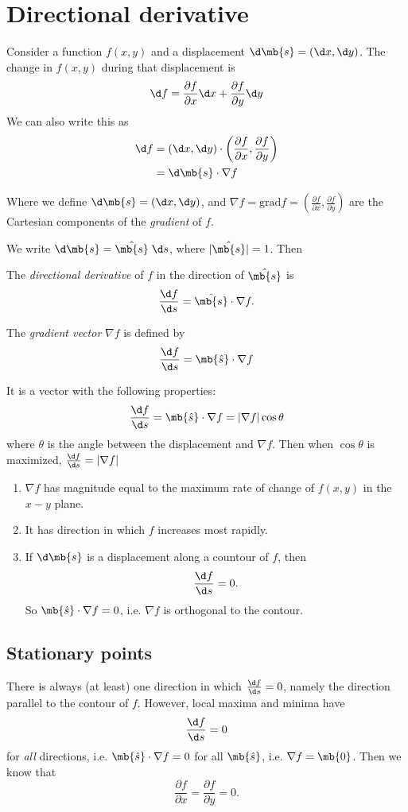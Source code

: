 \documentclass[a4paper]{article}
\begin{document}
\section{Directional derivative}
\label{sec:directional-derivative}
Consider a function $f(x, y)$ and a displacement $\d\mb{s} = (\d x, \d y)$. The change in $f(x, y)$ during that displacement is 
\[
\d f = \frac{\partial f}{\partial x}\d x + \frac{\partial f}{\partial y}\d y
\]
We can also write this as 
\begin{align*}
  \d f &= (\d x, \d y)\cdot \left(\frac{\partial f}{\partial x}, \frac{\partial f}{\partial y}\right)\\
  &= \d\mb{s}\cdot \nabla f
\end{align*}

Where we define $\d \mb{s} = (\d x, \d y)$, and $\nabla f = \mathrm{grad}f = \left(\frac{\partial f}{\partial x}, \frac{\partial f}{\partial y}\right)$ are the Cartesian components of the \emph{gradient} of $f$.

We write $\d\mb{s} = \hat{\mb{s}}\;\d s$, where $|\hat{\mb{s}}| = 1$. Then
\begin{defi}
  The \emph{directional derivative} of $f$ in the direction of $\hat{\mb{s}}$ is
  \[
  \frac{\d f}{\d s} = \hat{\mb{s}}\cdot \nabla f.
  \]
\end{defi}

\begin{defi}
  The \emph{gradient vector} $\nabla f$ is defined by
  \[
  \frac{\d f}{\d s} = \mb{\hat{s}}\cdot \nabla f
  \]
\end{defi}
It is a vector with the following properties: 
\[
\frac{\d f}{\d s} = \mb{\hat{s}}\cdot \nabla f = |\nabla f| \cos \theta
\]
where $\theta$ is the angle between the displacement and $\nabla f$. Then when $\cos\theta$ is maximized, $\frac{\d f}{\d s} = |\nabla f|$

\begin{enumerate}
\item $\nabla f$ has magnitude equal to the maximum rate of change of $f(x, y)$ in the $x-y$ plane.
\item It has direction in which $f$ increases most rapidly.
\item If $\d\mb{s}$ is a displacement along a countour of $f$, then
\[
\frac{\d f}{\d s} = 0.
\]
So $\mb{\hat{s}}\cdot \nabla f = 0$, i.e. $\nabla f$ is orthogonal to the contour.
\end{enumerate}
\subsection{Stationary points}
There is always (at least) one direction in which $\frac{\d f}{\d s} = 0$, namely the direction parallel to the contour of $f$. However, local maxima and minima have 
\[
\frac{\d f}{\d s} = 0
\]
for \emph{all} directions, i.e. $\mb{\hat{s}}\cdot \nabla f = 0$ for all $\mb{\hat{s}}$, i.e. $\nabla f = \mb{0}$. Then we know that
\[
\frac{\partial f}{\partial x} = \frac{\partial f}{\partial y} = 0.
\]
\pagebreak %
\end{document}
